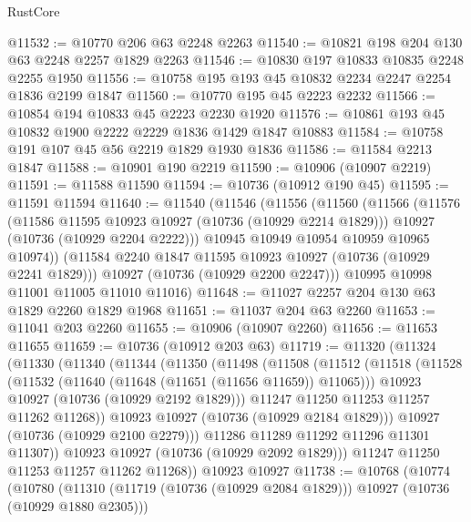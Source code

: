 \begin{lexlean}{RustCore}
\begin{coremodule}
@11532 := @10770 @206 @63 @2248 @2263
@11540 := @10821 @198 @204 @130 @63 @2248 @2257 @1829 @2263
@11546 := @10830 @197 @10833 @10835 @2248 @2255 @1950
@11556 := @10758 @195 @193 @45 @10832 @2234 @2247 @2254 @1836 @2199 @1847
@11560 := @10770 @195 @45 @2223 @2232
@11566 := @10854 @194 @10833 @45 @2223 @2230 @1920
@11576 := @10861 @193 @45 @10832 @1900 @2222 @2229 @1836 @1429 @1847 @10883
@11584 := @10758 @191 @107 @45 @56 @2219 @1829 @1930 @1836
@11586 := @11584 @2213 @1847
@11588 := @10901 @190 @2219
@11590 := @10906 (@10907 @2219)
@11591 := @11588 @11590
@11594 := @10736 (@10912 @190 @45)
@11595 := @11591 @11594
@11640 := @11540
    (@11546
      (@11556
        (@11560
          (@11566
            (@11576
              (@11586 @11595 @10923 @10927 (@10736 (@10929 @2214 @1829)))
              @10927
              (@10736 (@10929 @2204 @2222)))
            @10945
            @10949
            @10954
            @10959
            @10965
            @10974))
        (@11584 @2240 @1847 @11595 @10923 @10927 (@10736 (@10929 @2241 @1829)))
        @10927
        (@10736 (@10929 @2200 @2247)))
      @10995
      @10998
      @11001
      @11005
      @11010
      @11016)
@11648 := @11027 @2257 @204 @130 @63 @1829 @2260 @1829 @1968
@11651 := @11037 @204 @63 @2260
@11653 := @11041 @203 @2260
@11655 := @10906 (@10907 @2260)
@11656 := @11653 @11655
@11659 := @10736 (@10912 @203 @63)
@11719 := @11320
    (@11324
      (@11330
        (@11340
          (@11344
            (@11350
              (@11498
                (@11508
                  (@11512
                    (@11518
                      (@11528
                        (@11532 (@11640 (@11648 (@11651 (@11656 @11659)) @11065)))
                        @10923
                        @10927
                        (@10736 (@10929 @2192 @1829)))
                      @11247
                      @11250
                      @11253
                      @11257
                      @11262
                      @11268))
                  @10923
                  @10927
                  (@10736 (@10929 @2184 @1829)))
                @10927
                (@10736 (@10929 @2100 @2279)))
              @11286
              @11289
              @11292
              @11296
              @11301
              @11307))
          @10923
          @10927
          (@10736 (@10929 @2092 @1829)))
        @11247
        @11250
        @11253
        @11257
        @11262
        @11268))
    @10923
    @10927
@11738 := @10768
    (@10774
      (@10780
        (@11310 (@11719 (@10736 (@10929 @2084 @1829))) @10927 (@10736 (@10929 @1880 @2305)))

\end{coremodule}
\end{lexlean}

